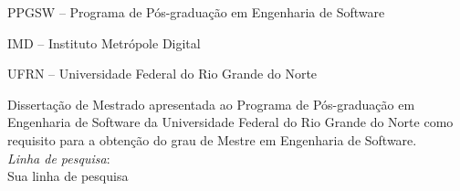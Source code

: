 
\instituicao
{
   PPGSW -- Programa de Pós-graduação em Engenharia de Software\par
   IMD -- Instituto Metrópole Digital\par
   UFRN -- Universidade Federal do Rio Grande do Norte
}
	
\comentario
{
	Dissertação de Mestrado apresentada ao Programa de Pós-graduação em Engenharia de Software da Universidade Federal do Rio Grande do Norte como requisito para a obtenção do grau de Mestre em Engenharia de Software.\bigskip\\
   \textit{Linha de pesquisa}:\\ Sua linha de pesquisa %
}
		

\folhaderosto